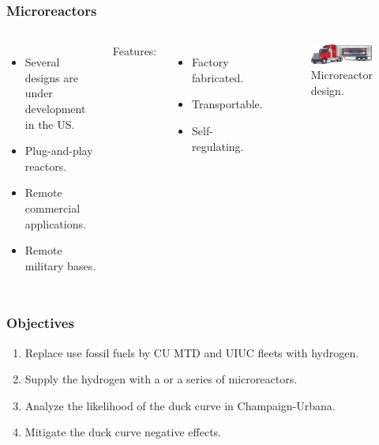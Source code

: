 \begin{frame}
\frametitle{Microreactors}
\begin{columns}
	\column[t]{5cm}
	\begin{itemize}
		\item Several designs are under development in the US.
		\item Plug-and-play reactors.
		\item Remote commercial applications.
		\item Remote military bases.
	\end{itemize}
	\vspace{1cm}
	Features:
	\begin{itemize}
		\item Factory fabricated.
		\item Transportable.
		\item Self-regulating.
	\end{itemize}

    \column[t]{5cm}
	\begin{figure}[htbp!]
		\begin{center}
			\includegraphics[width=5.2cm]{images/microreactor}
		\end{center}
		\caption{Microreactor design.}
	\end{figure}
\end{columns}
\end{frame}


\begin{frame}
\frametitle{Objectives}
\centering
    \begin{enumerate}
    	\item Replace use fossil fuels by CU MTD and UIUC fleets with hydrogen.
    	\item Supply the hydrogen with a or a series of microreactors.
    	\item Analyze the likelihood of the duck curve in Champaign-Urbana.
        \item Mitigate the duck curve negative effects.
	\end{enumerate}
\end{frame}
